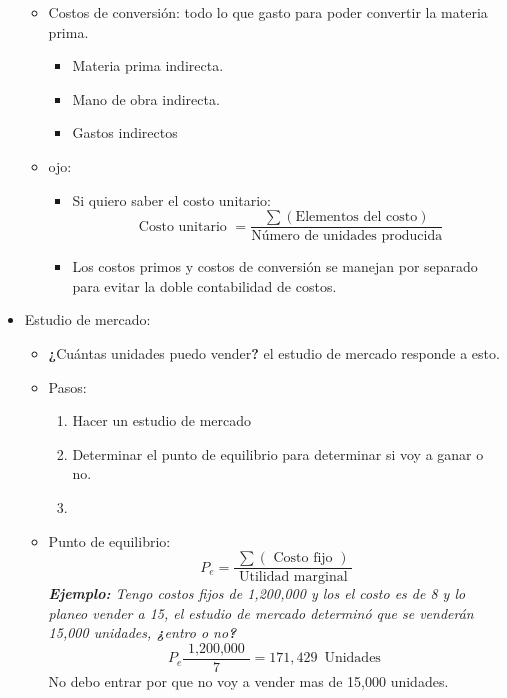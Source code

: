 \begin{itemize}
\begin{itemize}
            \item Costos de conversión: todo lo que gasto para poder convertir la materia prima.
                \begin{itemize}
                    \item Materia prima indirecta.
                    \item Mano de obra indirecta.
                    \item Gastos indirectos 
                \end{itemize}
            
            \item ojo:
                \begin{itemize}[label=\#]
                    \item Si quiero saber el costo unitario:
                        \[
                          \text{  Costo unitario  } = \frac{\sum(\text{Elementos del costo})}{\text{Número de unidades producida}} 
                        \]
                    \item Los costos primos y costos de conversión se manejan por separado para evitar la doble contabilidad de costos.
                \end{itemize}
        \end{itemize}
    
    \item Estudio de mercado:
        \begin{itemize}
            \item \textbf{¿}Cuántas unidades puedo vender\textbf{?} el estudio de mercado responde a esto.
            \item Pasos:
                \begin{enumerate}
                    \item Hacer un estudio de mercado 
                    \item Determinar el punto de equilibrio para determinar si voy a ganar o no.
                    \item 
                \end{enumerate}
            
            \item Punto de equilibrio:
                \[
                  P_e = \frac{\sum(\text{  Costo fijo   })}{\text{  Utilidad marginal  }} 
                \]
                \emph{\textbf{Ejemplo: }Tengo costos fijos de 1,200,000 y los el costo es de 8 y lo planeo vender a 15, el estudio de mercado determinó que se venderán 15,000 unidades, \textbf{¿}entro o no\textbf{?}}
                \[
                  P_e \frac{\text{  1,200,000  }}{\text{  7  }} = 171,429 \,\text{  Unidades  } 
                \]
                No debo entrar por que no voy a vender mas de 15,000 unidades.
        \end{itemize}
    

\end{itemize}
